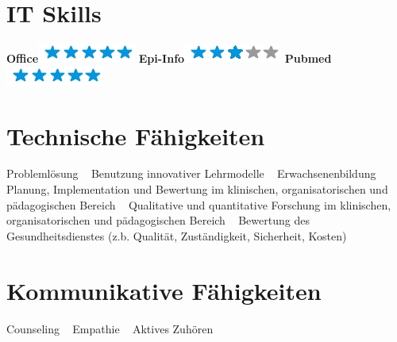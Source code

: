 \documentclass[11pt]{friggeri-cv}
\begin{document}
\begin{aside}
  \section{IT Skills}
  \textbf{Office}\includegraphics[scale=0.40]{img/5stars.png}
  \textbf{Epi-Info}\includegraphics[scale=0.40]{img/3stars.png}
  \textbf{Pubmed}\includegraphics[scale=0.40]{img/5stars.png}
  \section{Technische F\"{a}higkeiten}\footnotesize{
    Probleml\"{o}sung
    ~
    Benutzung innovativer Lehrmodelle
    ~
    Erwachsenenbildung
    ~
    Planung, Implementation und Bewertung im klinischen, organisatorischen und p\"{a}dagogischen Bereich 
    ~
    Qualitative und quantitative Forschung im klinischen, organisatorischen und p\"{a}dagogischen Bereich
    ~
    Bewertung des Gesundheitsdienstes (z.b. Qualit\"{a}t, Zust\"{a}ndigkeit, Sicherheit, Kosten)}
  \section{Kommunikative F\"{a}higkeiten}\footnotesize{
    Counseling
    ~
    Empathie
    ~
    Aktives Zuh\"{o}ren}
\end{aside}
\end{document}
